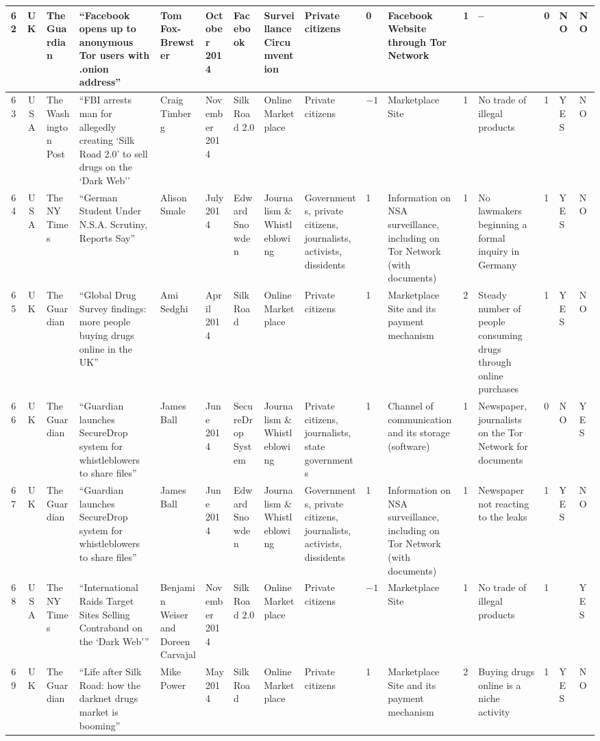 \begin{landscape}
{\begin{longtable}{|c|c|p{1.2cm}|p{2.5cm}|p{1.4cm}|p{1.2cm}|p{1.4cm}|p{1.2cm}|p{1.8cm}|p{0.4cm}|p{1.8cm}|p{0.4cm}|p{1.5cm}|p{0.4cm}|p{0.6cm}|p{0.6cm}|}
\hline
62 & UK & The Guardian & ``Facebook opens up to anonymous Tor users with .onion address'' & Tom Fox-Brewster & October 2014 &Facebook & Surveillance Circumvention & Private citizens & 0 & Facebook Website through Tor Network & 1 & -- & 0 & NO & NO \\
\hline
63 & USA & The Washington Post & ``FBI arrests man for allegedly creating `Silk Road 2.0' to sell drugs on the `Dark Web'' & Craig Timberg & November 2014 &Silk Road 2.0 & Online Marketplace & Private citizens & $-1$ & Marketplace Site & 1 & No trade of illegal products & 1 & YES & NO \\
\hline
64 & USA & The NY Times & ``German Student Under N.S.A. Scrutiny, Reports Say'' & Alison Smale & July  2014 &Edward Snowden & Journalism \& Whistleblowing & Governments, private citizens, journalists, activists, dissidents & 1 & Information on NSA surveillance, including on Tor Network (with documents) & 1 & No lawmakers beginning a formal inquiry in Germany & 1 & YES & NO \\
\hline
65 & UK & The Guardian & ``Global Drug Survey findings: more people buying drugs online in the UK'' & Ami Sedghi & April 2014 &Silk Road & Online Marketplace & Private citizens & 1 & Marketplace Site and its payment mechanism & 2 & Steady number of people consuming drugs through online purchases & 1 & YES & NO \\
\hline
66 & UK & The Guardian & ``Guardian launches SecureDrop system for whistleblowers to share files'' & James Ball & June 2014 &SecureDrop System & Journalism \& Whistleblowing & Private citizens, journalists, state governments & 1 & Channel of communication and its storage (software) & 1 & Newspaper, journalists on the Tor Network for documents & 0 & NO & YES \\
\hline
67 & UK & The Guardian & ``Guardian launches SecureDrop system for whistleblowers to share files'' & James Ball & June 2014 &Edward Snowden & Journalism \& Whistleblowing & Governments, private citizens, journalists, activists, dissidents & 1 & Information on NSA surveillance, including on Tor Network (with documents) & 1 & Newspaper not reacting to the leaks & 1 & YES & NO \\
\hline
68 & USA & The NY Times & ``International Raids Target Sites Selling Contraband on the `Dark Web''' & Benjamin Weiser and Doreen Carvajal & November 2014 &Silk Road 2.0 & Online Marketplace & Private citizens & $-1$ & Marketplace Site & 1 & No trade of illegal products & 1 &  & YES \\
\hline
69 & UK & The Guardian & ``Life after Silk Road: how the darknet drugs market is booming'' & Mike Power & May 2014 &Silk Road & Online Marketplace & Private citizens & 1 & Marketplace Site and its payment mechanism & 2 & Buying drugs online is a niche activity & 1 & YES & NO \\

\end{longtable}}
\end{landscape}

